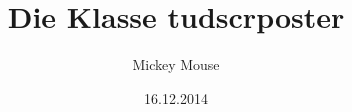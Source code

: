 \documentclass[ngerman,
]%
{tudscrreprt}
\begin{document}
\date{16.12.2014}
\author{Mickey Mouse}
\title{Die Klasse tudscrposter}



\blindtext
{}

\makeatletter
\meaning\@ps@plain@alias
\end{document}
